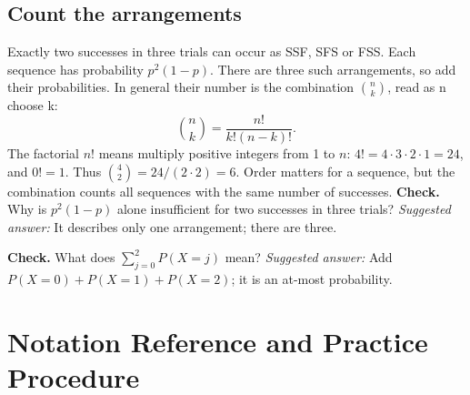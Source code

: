 \subsection{Count the arrangements}
Exactly two successes in three trials can occur as SSF, SFS or FSS. Each sequence has probability $p^2(1-p)$. There are three such arrangements, so add their probabilities. In general their number is the combination $\binom nk$, read as n choose k:
\[\binom nk=\frac{n!}{k!(n-k)!}.\]
The factorial $n!$ means multiply positive integers from 1 to $n$: $4!=4\cdot3\cdot2\cdot1=24$, and $0!=1$. Thus $\binom42=24/(2\cdot2)=6$. Order matters for a sequence, but the combination counts all sequences with the same number of successes.
\textbf{Check.} Why is $p^2(1-p)$ alone insufficient for two successes in three trials? \emph{Suggested answer:} It describes only one arrangement; there are three.

\textbf{Check.} What does $\sum_{j=0}^{2}P(X=j)$ mean? \emph{Suggested answer:} Add $P(X=0)+P(X=1)+P(X=2)$; it is an at-most probability.

\clearpage
\section{Notation Reference and Practice Procedure}\label{sec:notation-and-procedure}
